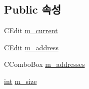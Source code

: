 \subsection*{Public 속성}
\begin{DoxyCompactItemize}
\item 
C\+Edit \mbox{\hyperlink{class_g_b_memory_viewer_dlg_a6348445a74339561b811824e2698d501}{m\+\_\+current}}
\item 
C\+Edit \mbox{\hyperlink{class_g_b_memory_viewer_dlg_abf9f9d9537192c37806951dc8b1f96c0}{m\+\_\+address}}
\item 
C\+Combo\+Box \mbox{\hyperlink{class_g_b_memory_viewer_dlg_af3cb69fc0a793bfb57e2abebbb300e4d}{m\+\_\+addresses}}
\item 
\mbox{\hyperlink{_util_8cpp_a0ef32aa8672df19503a49fab2d0c8071}{int}} \mbox{\hyperlink{class_g_b_memory_viewer_dlg_a9837ff346b59fb46c6b778a0adf8adf8}{m\+\_\+size}}
\end{DoxyCompactItemize}
